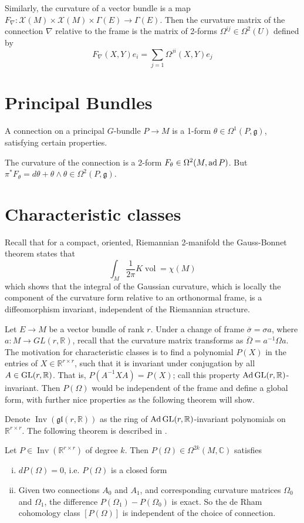 Similarly, the curvature of a vector bundle is a map $F_\nabla :
\mathcal{X}(M)\times \mathcal{X}(M) \times \Gamma(E) \to \Gamma(E)$. Then the
curvature matrix of the connection $\nabla$ relative to the frame is the matrix
of 2-forms  $\Omega^{ij}\in \Omega^2(U)$ defined by
\[
F_\nabla(X,Y)e_i = \sum_{j=1} \Omega^{ji}(X,Y)e_j
\] 

\section{Principal Bundles}
A connection on a principal $G$-bundle $P\to M$ is a 1-form $\theta \in
\Omega^1(P,\mathfrak{g})$, satisfying certain properties.

The curvature of the connection is a 2-form $F_\theta\in\Omega^2(M,\operatorname{ad} P)$.
But $\pi^* F_\theta = d\theta + \theta\wedge\theta \in\Omega^2(P,\mathfrak{g})$.


\section{Characteristic classes}
Recall that for a compact, oriented, Riemannian 2-manifold the Gauss-Bonnet
theorem states that 
\[
	\int_M \frac{1}{2\pi} K \operatorname{vol} = \chi(M)
\] 
which shows that the integral of the Gaussian curvature, which is locally the 
component of the curvature form relative to an orthonormal frame, is a
diffeomorphism invariant, independent of the Riemannian structure. 

Let $E\to M$ be a vector bundle of rank $r$. Under a change of frame
$\overline{\sigma}= \sigma a$, where $a : M \to GL(r,\mathbb{R})$, recall that
the curvature matrix transforms as $\overline{\Omega}=a^{-1}\Omega a$.  
The motivation for characteristic classes is to find a polynomial $P(X)$ in the
entries of $X\in \mathbb{R}^{r\times r}$, such that it is invariant under
conjugation by all $A\in \operatorname{GL}(r,\mathbb{R})$. That is, $P(A^{-1}XA)=P(X)$; call
this property $\operatorname{Ad} \operatorname{GL}(r,\mathbb{R})$-invariant. Then $P(\Omega)$ would be
independent of the frame and define a global form, with further nice
properties as the following theorem will show.

Denote $\operatorname{Inv}(\mathfrak{gl}(r,\mathbb{R}))$ as the ring of $\operatorname{Ad}
\operatorname{GL}(r,\mathbb{R})$-invariant polynomials on $\mathbb{R}^{r\times r}$.
The following theorem is described in \cite[Thm 23.3]{loringtu}.

\begin{thm} \label{thm:chern_weil}
	Let $P\in\operatorname{Inv}(\mathbb{R}^{r\times r})$ of degree $k$. 
	Then $P(\Omega) \in \Omega^{2k}(M,\mathbb{C})$ satisfies
	\begin{enumerate}[(i)]
	    \item $dP(\Omega)= 0$, i.e. $P(\Omega)$ is a closed form
		\item Given two connections $A_0$ and $A_1$, and corresponding
			 curvature matrices $\Omega_0$ and $\Omega_1$, the difference
			 $P(\Omega_1)-P(\Omega_0)$ is exact. So the de Rham cohomology class
			 $[P(\Omega)]$ is independent of the choice of connection.
	\end{enumerate}
\end{thm}


